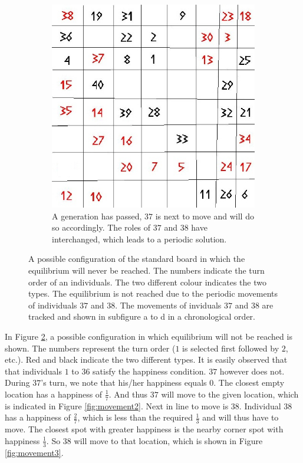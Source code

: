 \begin{figure}[H]
\begin{subfigure}{0.3\textwidth}
        \includegraphics[width=\textwidth]{Tegenvoorbeeld/segregation_tegenvb_3.jpg}
        \caption{A generation has passed, $37$ is next to move and will do so accordingly. The roles of  $37$ and $38$ have interchanged, which leads to a periodic solution. }
        \label{fig:movement4}
    \end{subfigure}
    \caption{A possible configuration of the standard board in which the equilibrium will never be reached. The numbers indicate the turn order of an individuals. The two different colour indicates the two types. The equilibrium is not reached due to the periodic movements of individuals $37$ and $38$. The movements of inviduals $37$ and $38$ are tracked and shown in subfigure a to d in a chronological order.}\label{fig:equilibrium counterexample}
\end{figure}

In Figure \ref{fig:equilibrium counterexample}, a possible configuration in which  equilibrium will not be reached is shown. 
The numbers represent the turn order ($1$ is selected first followed by $2$, etc.). 
Red and black indicate  the two different types. It is easily observed that that individuals $1$ to $36$ satisfy the happiness condition. $37$ however does not. 
During $37$'s turn, we note that his/her happiness equals $0$. 
The closest empty location has a happiness of $\frac{1}{7}$. 
And thus $37$ will move to the given location, which is indicated in Figure \ref{fig:movement2}.
Next in line to move is $38$. 
Individual $38$ has a happiness of $\frac{2}{7}$, which is less than the required $\frac{1}{3}$ and will thus have to move. 
The closest spot with greater happiness is the nearby corner spot with happiness $\frac{1}{3}$. 
So $38$ will move to that location, which is shown in Figure \ref{fig:movement3}.\\

